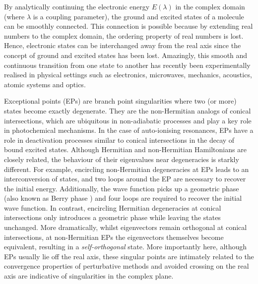 \documentclass[aps,prb,reprint,noshowkeys,superscriptaddress]{revtex4-1}
\begin{document}
By analytically continuing the electronic energy $E(\lambda)$ in the complex domain (where $\lambda$ is a coupling parameter), the ground and excited states of a molecule can be smoothly connected.
This connection is possible because by extending real numbers to the complex domain, the ordering property of real numbers is lost.
Hence, electronic states can be interchanged away from the real axis since the concept of ground and excited states has been lost.
Amazingly, this smooth and continuous transition from one state to another has recently been experimentally realised in physical settings such as electronics, microwaves, mechanics, acoustics, atomic systems and optics. \cite{Bittner_2012,Chong_2011,Chtchelkatchev_2012,Doppler_2016,Guo_2009,Hang_2013,Liertzer_2012,Longhi_2010,Peng_2014, Peng_2014a,Regensburger_2012,Ruter_2010,Schindler_2011,Szameit_2011,Zhao_2010,Zheng_2013,Choi_2018,El-Ganainy_2018}

Exceptional points (EPs) are branch point singularities where two (or more) states become exactly degenerate. \cite{MoiseyevBook,Heiss_1988,Heiss_1990,Heiss_1999,Berry_2011,Heiss_2012,Heiss_2016,Benda_2018}
They are the non-Hermitian analogs of conical intersections, \cite{Yarkony_1996} which are ubiquitous in non-adiabatic processes and play a key role in photochemical mechanisms.
In the case of auto-ionising resonances, EPs have a role in deactivation processes similar to conical intersections in the decay of bound excited states. \cite{Benda_2018}
Although Hermitian and non-Hermitian Hamiltonians are closely related, the behaviour of their eigenvalues near degeneracies is starkly different.
For example, encircling non-Hermitian degeneracies at EPs leads to an interconversion of states, and two loops around the EP are necessary to recover the initial energy. \cite{MoiseyevBook,Heiss_2016,Benda_2018}
Additionally, the wave function picks up a geometric phase (also known as Berry phase \cite{Berry_1984}) and four loops are required to recover the initial wave function.
In contrast, encircling Hermitian degeneracies at conical intersections only introduces a geometric phase while leaving the states unchanged.
More dramatically, whilst eigenvectors remain orthogonal at conical intersections, at non-Hermitian EPs the eigenvectors themselves become equivalent, resulting in a \textit{self-orthogonal} state. \cite{MoiseyevBook}
More importantly here, although EPs usually lie off the real axis, these singular points are intimately related to the convergence properties of perturbative methods and avoided crossing on the real axis are indicative of singularities in the complex plane. \cite{BenderBook,Olsen_1996,Olsen_2000,Olsen_2019,Mihalka_2017a,Mihalka_2017b,Mihalka_2019}
\end{document}
